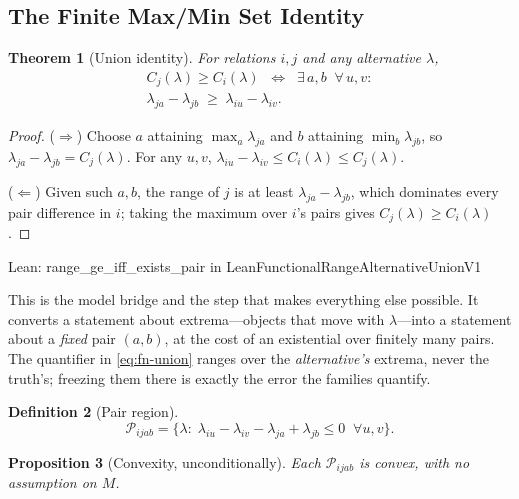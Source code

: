 \documentclass[conference]{IEEEtran}
\newtheorem{theorem}{Theorem}
\newtheorem{proposition}[theorem]{Proposition}
\theoremstyle{definition}
\newtheorem{definition}[theorem]{Definition}
\newcommand{\lean}[1]{\textsf{\footnotesize #1}}
\newcommand{\leanbox}[1]{%
  \par\vspace{2pt}\noindent
  {\footnotesize\textsf{Lean: #1}}\par\vspace{2pt}}
\begin{document}
\subsection{The Finite Max/Min Set Identity}
\label{sec:fn-union}

\begin{theorem}[Union identity]
\label{thm:fn-union}
For relations $i,j$ and any alternative $\lambda$,
\begin{multline}
C_{j}(\lambda)\geq C_{i}(\lambda)
\;\;\Longleftrightarrow\;\;
\exists\,a,b\;\;\forall\,u,v:\\
\lambda_{ja}-\lambda_{jb}\;\geq\;\lambda_{iu}-\lambda_{iv}.
\label{eq:fn-union}
\end{multline}
\end{theorem}

\begin{proof}
($\Rightarrow$) Choose $a$ attaining $\max_{a}\lambda_{ja}$ and $b$ attaining
$\min_{b}\lambda_{jb}$, so $\lambda_{ja}-\lambda_{jb}=C_{j}(\lambda)$. For any $u,v$,
$\lambda_{iu}-\lambda_{iv}\le C_{i}(\lambda)\le C_{j}(\lambda)$.

($\Leftarrow$) Given such $a,b$, the range of $j$ is at least $\lambda_{ja}-\lambda_{jb}$,
which dominates every pair difference in $i$; taking the maximum over $i$'s pairs gives
$C_{j}(\lambda)\ge C_{i}(\lambda)$.
\end{proof}

\leanbox{\lean{range\_ge\_iff\_exists\_pair} in
\lean{LeanFunctionalRangeAlternativeUnionV1}}

This is the model bridge and the step that makes everything else possible. It converts a
statement about extrema---objects that move with $\lambda$---into a statement about a
\emph{fixed} pair $(a,b)$, at the cost of an existential over finitely many pairs. The
quantifier in \eqref{eq:fn-union} ranges over the \emph{alternative's} extrema, never the
truth's; freezing them there is exactly the error the families quantify.

\begin{definition}[Pair region]
\begin{equation}
\mathcal{P}_{ijab}=\bigl\{\lambda:\;
\lambda_{iu}-\lambda_{iv}-\lambda_{ja}+\lambda_{jb}\leq 0
\;\;\forall u,v\bigr\}.
\label{eq:fn-polyhedron}
\end{equation}
\end{definition}

\begin{proposition}[Convexity, unconditionally]
\label{prop:fn-convex}
Each $\mathcal{P}_{ijab}$ is convex, with no assumption on $M$.
\end{proposition}
\end{document}
